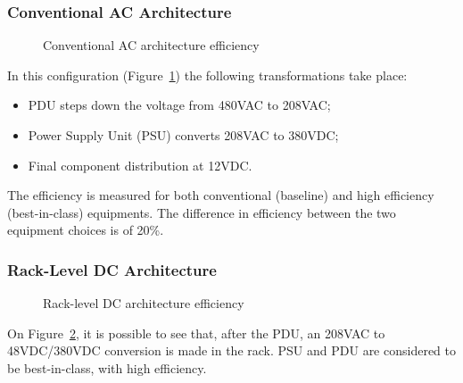             \subsubsection*{Conventional AC Architecture}
                \begin{figure}[h!tb]
                    \centering
                    \caption{Conventional AC architecture efficiency}
                    \label{fig:conventional_ac_efficiency}
                \end{figure}
                In this configuration (Figure~\ref{fig:conventional_ac_efficiency}) the following transformations take place:
                \begin{itemize}
	                \item PDU steps down the voltage from 480VAC to 208VAC;
                    \item Power Supply Unit (PSU) converts 208VAC to 380VDC;
                    \item Final component distribution at 12VDC.
                \end{itemize}
                The efficiency is measured for both conventional (baseline) and high efficiency (best-in-class) equipments. The difference in efficiency between the two equipment choices is of 20\%.

            \subsubsection*{Rack-Level DC Architecture}
                \begin{figure}[h!tb]
                    \centering
                    \caption{Rack-level DC architecture efficiency}
                    \label{fig:rack_level_dc_efficiency}
                \end{figure}
                On Figure~\ref{fig:rack_level_dc_efficiency}, it is possible to see that, after the PDU, an 208VAC to 48VDC/380VDC conversion is made in the rack. PSU and PDU are considered to be best-in-class, with high efficiency.

